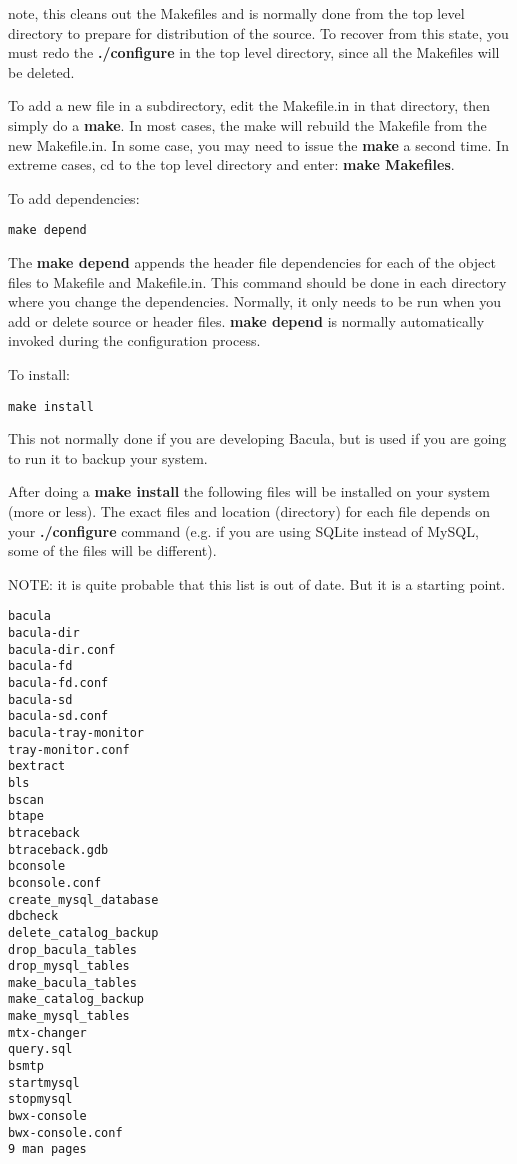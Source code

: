 note, this cleans out the Makefiles and is normally done from the top level
directory to prepare for distribution of the source. To recover from this
state, you must redo the {\bf ./configure} in the top level directory, since
all the Makefiles will be deleted. 

To add a new file in a subdirectory, edit the Makefile.in in that directory,
then simply do a {\bf make}. In most cases, the make will rebuild the Makefile
from the new Makefile.in. In some case, you may need to issue the {\bf make} a
second time. In extreme cases, cd to the top level directory and enter: {\bf
make Makefiles}. 

To add dependencies: 

\footnotesize
\begin{verbatim}
make depend
\end{verbatim}
\normalsize

The {\bf make depend} appends the header file dependencies for each of the
object files to Makefile and Makefile.in. This command should be done in each
directory where you change the dependencies. Normally, it only needs to be run
when you add or delete source or header files. {\bf make depend} is normally
automatically invoked during the configuration process. 

To install: 

\footnotesize
\begin{verbatim}
make install
\end{verbatim}
\normalsize

This not normally done if you are developing Bacula, but is used if you are
going to run it to backup your system. 

After doing a {\bf make install} the following files will be installed on your
system (more or less). The exact files and location (directory) for each file
depends on your {\bf ./configure} command (e.g. if you are using SQLite instead
of MySQL, some of the files will be different).

NOTE: it is quite probable that this list is out of date.  But it is a
starting point.

\footnotesize
\begin{verbatim}
bacula
bacula-dir
bacula-dir.conf
bacula-fd
bacula-fd.conf
bacula-sd
bacula-sd.conf
bacula-tray-monitor
tray-monitor.conf
bextract
bls
bscan
btape
btraceback
btraceback.gdb
bconsole
bconsole.conf
create_mysql_database
dbcheck
delete_catalog_backup
drop_bacula_tables
drop_mysql_tables
make_bacula_tables
make_catalog_backup
make_mysql_tables
mtx-changer
query.sql
bsmtp
startmysql
stopmysql
bwx-console
bwx-console.conf
9 man pages
\end{verbatim}
\normalsize

